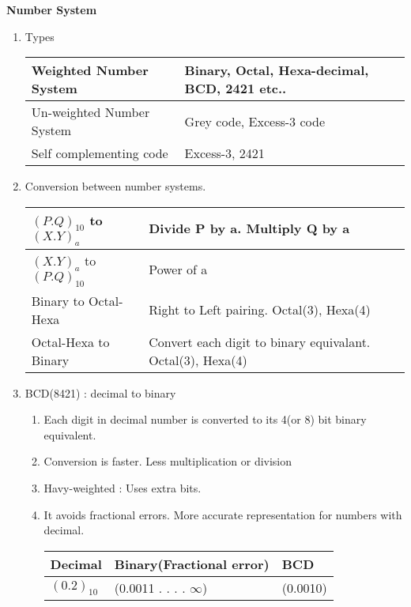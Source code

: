 \centerline{\textbf{ \LARGE Number System}}

\begin{enumerate}
    \item Types \\
    \begin{myTableStyle} \begin{tabular}{ |m{5cm}|m{8cm}| } \hline
        Weighted Number System      &   Binary, Octal, Hexa-decimal, BCD, 2421 etc.. \\ \hline
        Un-weighted Number System   &   Grey code, Excess-3 code  \\ \hline
        Self complementing code     &   Excess-3, 2421\\ \hline
    \end{tabular} \end{myTableStyle} \vspace{0.08in}

    \item Conversion between number systems.\\
    \begin{myTableStyle} \begin{tabular}{ |m{5cm}|m{9cm}| } \hline
        { \Large \( (P.Q)_{10}\) to \( (X.Y)_a\) }      &   Divide P by a. Multiply Q by a \\ \hline
        { \Large \( (X.Y)_a\) to \( (P.Q)_{10}\) }      &   Power of a \\ \hline
        Binary to Octal-Hexa                            &   Right to Left pairing. Octal(3), Hexa(4) \\ \hline
        Octal-Hexa to Binary                            &   Convert each digit to binary equivalant. Octal(3), Hexa(4) \\ \hline
    \end{tabular} \end{myTableStyle} \vspace{0.08in}

    \item BCD(8421) : decimal to binary
    \begin{enumerate}
    \item Each digit in decimal number is converted to its 4(or 8) bit binary equivalent.
    \item Conversion is faster. Less multiplication or division
    \item Havy-weighted : Uses extra bits.
    \item It avoids fractional errors. More accurate representation for numbers with decimal.\\
    \begin{myTableStyle} \begin{tabular}{ |m{3cm}|m{4cm}|m{3cm}| } \hline
        Decimal                 & Binary(Fractional error)     & BCD       \\ \hline
        {\Large \((0.2)_{10}\)} & (0.0011 . . . . \(\infty\))   & (0.0010)  \\ \hline
    \end{tabular} \end{myTableStyle} \vspace{0.08in}


\end{enumerate}
\end{enumerate}
